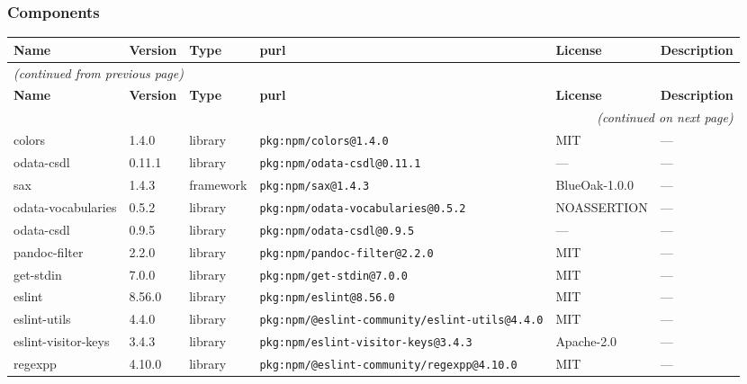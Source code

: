 \documentclass[11pt,a4paper]{article}
\begin{document}
\subsubsection*{Components}
\begin{longtable}{|p{4cm}|p{2cm}|p{1.6cm}|p{5cm}|p{1.5cm}|p{3.5cm}|}
\toprule
\rowcolor{sbomhdr}\textbf{Name} & \textbf{Version} & \textbf{Type} & \textbf{purl} & \textbf{License} & \textbf{Description} \\
\midrule
\endfirsthead
\multicolumn{6}{l}{\small\itshape (continued from previous page)} \\
\toprule
\rowcolor{sbomhdr}\textbf{Name} & \textbf{Version} & \textbf{Type} & \textbf{purl} & \textbf{License} & \textbf{Description} \\
\midrule
\endhead
\midrule
\multicolumn{6}{r}{\small\itshape (continued on next page)} \\
\endfoot
\bottomrule
\endlastfoot
\raggedright colors & 1.4.0 & library & \small\texttt{pkg:npm/colors@1.4.0} & MIT & \small — \\
\raggedright odata-csdl & 0.11.1 & library & \small\texttt{pkg:npm/odata-csdl@0.11.1} & — & \small — \\
\raggedright sax & 1.4.3 & framework & \small\texttt{pkg:npm/sax@1.4.3} & BlueOak-1.0.0 & \small — \\
\raggedright odata-vocabularies & 0.5.2 & library & \small\texttt{pkg:npm/odata-vocabularies@0.5.2} & NOASSERTION & \small — \\
\raggedright odata-csdl & 0.9.5 & library & \small\texttt{pkg:npm/odata-csdl@0.9.5} & — & \small — \\
\raggedright pandoc-filter & 2.2.0 & library & \small\texttt{pkg:npm/pandoc-filter@2.2.0} & MIT & \small — \\
\raggedright get-stdin & 7.0.0 & library & \small\texttt{pkg:npm/get-stdin@7.0.0} & MIT & \small — \\
\raggedright eslint & 8.56.0 & library & \small\texttt{pkg:npm/eslint@8.56.0} & MIT & \small — \\
\raggedright eslint-utils & 4.4.0 & library & \small\texttt{pkg:npm/@eslint-community/eslint-utils@4.4.0} & MIT & \small — \\
\raggedright eslint-visitor-keys & 3.4.3 & library & \small\texttt{pkg:npm/eslint-visitor-keys@3.4.3} & Apache-2.0 & \small — \\
\raggedright regexpp & 4.10.0 & library & \small\texttt{pkg:npm/@eslint-community/regexpp@4.10.0} & MIT & \small — \\

\end{longtable}
\end{document}
